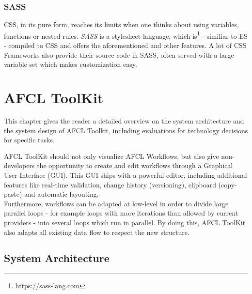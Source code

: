 \documentclass[a4paper,top=25mm,bottom=25mm,12pt,pdftex,halfparskip,twoside,bibtotoc,numbers=noenddot]{scrbook}
\begin{document}
\subsection{SASS}

CSS, in its pure form, reaches its limits when one thinks about using variables, functions or nested rules. \textit{SASS} is a stylesheet language, which is\footnote{https://sass-lang.com} - similiar to ES - compiled to CSS and offers the aforementioned and other features.
A lot of CSS Frameworks also provide their source code in SASS, often served with a large variable set which makes customization easy.

\chapter{AFCL ToolKit }
\label{chap:implementation}

This chapter gives the reader a detailed overview on the system architecture and the system design of AFCL Toolkit, including evaluations for technology decisions for specific tasks.

AFCL ToolKit should not only visualize AFCL Workflows, but also give non-developers the opportunity to create and edit workflows through a Graphical User Interface (GUI). This GUI ships with a powerful editor, including additional features like real-time validation, change history (versioning), clipboard (copy-paste) and automatic layouting.\\
Furthermore, workflows can be adapted at low-level in order to divide large parallel loops - for example loops with more iterations than allowed by current providers - into several loops which run in parallel. By doing this, AFCL ToolKit also adapts  all existing data flow to respect the new structure.

\section{System Architecture}



\end{document}

